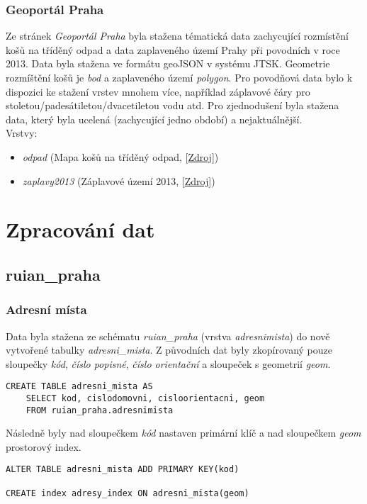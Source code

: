 \documentclass[a4paper, 12pt]{article}
\begin{document}
\subsubsection{Geoportál Praha}
Ze stránek \textit{Geoportál Praha} byla stažena tématická data zachycující rozmístění košů na tříděný odpad a data zaplaveného území Prahy při povodních v roce 2013. Data byla stažena ve formátu geoJSON v systému JTSK. Geometrie rozmíštění košů je \textit{bod} a zaplaveného území \textit{polygon}. Pro povodňová data bylo k dispozici ke stažení vrstev mnohem více, například záplavové čáry pro stoletou/padesátiletou/dvacetiletou vodu atd. Pro zjednodušení byla stažena data, který byla ucelená (zachycující jedno období) a nejaktuálnější.\\

Vrstvy:
\begin{itemize}
\item \textsl{odpad} (Mapa košů na tříděný odpad, [\href{http://www.geoportalpraha.cz/cs/opendata/DBD0F925-78BF-478D-8FB8-8B3BDE9BD581#.XFDFzGlCfIV}{Zdroj}])
\item \textsl{zaplavy2013} (Záplavové území 2013, [\href{http://www.geoportalpraha.cz/cs/opendata/C121457E-5450-42D0-9009-204D8D899A06#.XE9PwWlCfIV}{Zdroj}])
\end{itemize}


\section{Zpracování dat}
\subsection{ruian\_praha}
\subsubsection*{Adresní místa}
Data byla stažena ze schématu \textit{ruian\_praha} (vrstva \textit{adresnimista}) do nově vytvořené tabulky \textsl{adresni\_mista}. Z původních dat byly zkopírovaný pouze sloupečky \textsl{kód}, \textsl{číslo popisné}, \textsl{číslo orientační} a sloupeček s geometrií \textsl{geom}. 
\begin{lstlisting}
CREATE TABLE adresni_mista AS
    SELECT kod, cislodomovni, cisloorientacni, geom
    FROM ruian_praha.adresnimista
\end{lstlisting}

Následně byly nad sloupečkem \textsl{kód} nastaven primární klíč a nad sloupečkem \textsl{geom} prostorový index.
\begin{lstlisting}
ALTER TABLE adresni_mista ADD PRIMARY KEY(kod)

CREATE index adresy_index ON adresni_mista(geom)
\end{lstlisting}
\end{document}
